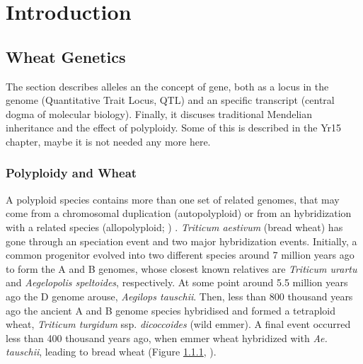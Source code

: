 

\chapter{Introduction}



\section{Wheat Genetics}
The section describes alleles an the concept of gene, both as a locus in the genome (Quantitative Trait Locus, QTL) and an specific transcript (central dogma of molecular biology). Finally, it discuses traditional Mendelian inheritance and the effect of polyploidy.  Some of this is described in the Yr15 chapter, maybe it is not needed any more here. 


\subsection{Polyploidy and Wheat}
\label{lit:polyploidy}

A polyploid species contains more than one set of related genomes, that may come from a chromosomal duplication (autopolyploid) or from an hybridization with a related species (allopolyploid; \citealt{Shewry2009}) . 
\textit{Triticum aestivum} (bread wheat) has gone through an speciation event and two major hybridization events. 
Initially, a common progenitor evolved into two different species around 7 million years ago to form the A and B genomes, whose closest known relatives are \textit{Triticum urartu} and \textit{Aegelopolis speltoides}, respectively. 
At some point around 5.5 million years ago the D genome arouse, \textit{Aegilops tauschii}. 
Then, less than 800 thousand years ago the ancient A and B genome species hybridised and formed a tetraploid wheat, \textit{Triticum turgidum} ssp. \textit{dicoccoides} (wild emmer). 
A final event occurred less than 400 thousand years ago, when emmer wheat hybridized with \textit{Ae. tauschii}, leading to bread wheat (Figure \ref{lit:polyploidy}, \citealt{Marcussen2014}).  

